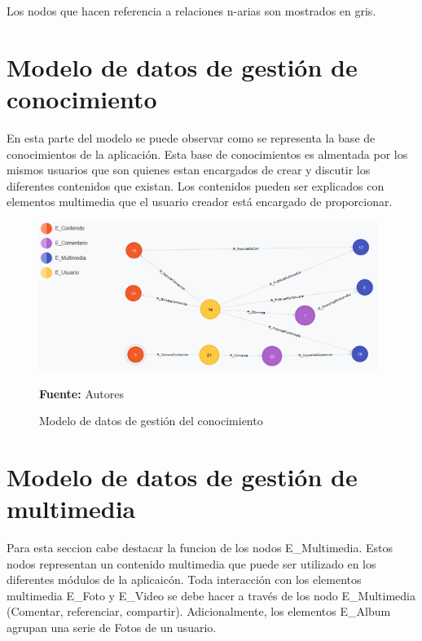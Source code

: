 Los nodos que hacen referencia a relaciones n-arias son mostrados en gris.

\section{Modelo de datos de gestión de conocimiento}

En esta parte del modelo se puede observar como se representa la base de conocimientos de la aplicación. Esta base de conocimientos es almentada por los mismos usuarios que son quienes estan encargados de crear y discutir los diferentes contenidos que existan. Los contenidos pueden ser explicados con elementos multimedia que el usuario creador está encargado de proporcionar.

\begin{figure}[!htb]
  \begin{center}
    \includegraphics[width=11cm]{./imagenes/Modelo_de_datos/Contenidos.png}
    \caption{Modelo de datos de gestión del conocimiento}
    \label{fig:modelo_datos_gestion_conocimiento}
    \textbf{Fuente:}  Autores
  \end{center}
\end{figure}

\section{Modelo de datos de gestión de multimedia}

Para esta seccion cabe destacar la funcion de los nodos E\_Multimedia. Estos nodos representan un contenido multimedia que puede ser utilizado en los diferentes módulos de la aplicaicón. Toda interacción con los elementos multimedia E\_Foto y E\_Video se debe hacer a través de los nodo E\_Multimedia (Comentar, referenciar, compartir). Adicionalmente, los elementos E\_Album agrupan una serie de Fotos de un usuario.

